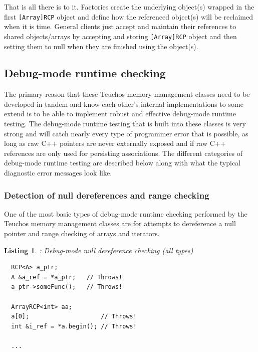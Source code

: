 \documentclass[pdf,ps2pdf,11pt]{SANDreport}
\newtheorem{listing}{Listing}
\begin{document}
That is all there is to it.  Factories create the underlying object(s)
wrapped in the first {}\texttt{[Array]RCP} object and define how the
referenced object(s) will be reclaimed when it is time.  General
clients just accept and maintain their references to shared
objects/arrays by accepting and storing {}\texttt{[Array]RCP} object
and then setting them to null when they are finished using the
object(s).


%
{}\subsection{Debug-mode runtime checking}
\label{sec:debug-mode-runtime-checking}
%

The primary reason that these Teuchos memory management classes need
to be developed in tandem and know each other's internal
implementations to some extend is to be able to implement robust and
effective debug-mode runtime testing.  The debug-mode runtime testing
that is built into these classes is very strong and will catch nearly
every type of programmer error that is possible, as long as raw C++
pointers are never externally exposed and if raw C++ references are
only used for persisting associations.  The different categories of
debug-mode runtime testing are described below along with what the
typical diagnostic error messages look like.


%
{}\subsubsection{Detection of null dereferences and range checking}
\label{sec:null-dereferences-range-checking}
%

One of the most basic types of debug-mode runtime checking performed
by the Teuchos memory management classes are for attempts to
dereference a null pointer and range checking of arrays and iterators.

\begin{listing}: Debug-mode null dereference checking (all types) \\
\label{listing:null-deref}
{\small\begin{verbatim}
  RCP<A> a_ptr;
  A &a_ref = *a_ptr;   // Throws!
  a_ptr->someFunc();   // Throws!

  ArrayRCP<int> aa;
  a[0];                    // Throws!
  int &i_ref = *a.begin(); // Throws!

  ...  
\end{verbatim}}
\end{listing}
\end{document}
